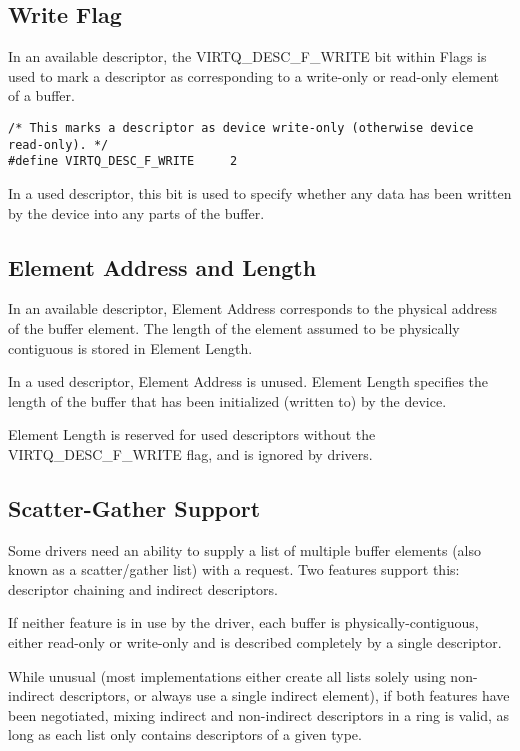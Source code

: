 \subsection{Write Flag}
\label{sec:Packed Virtqueues / Write Flag}

In an available descriptor, the VIRTQ_DESC_F_WRITE bit within Flags
is used to mark a descriptor as corresponding to a write-only or
read-only element of a buffer.

\begin{lstlisting}
/* This marks a descriptor as device write-only (otherwise device read-only). */
#define VIRTQ_DESC_F_WRITE     2
\end{lstlisting}

In a used descriptor, this bit is used to specify whether any
data has been written by the device into any parts of the buffer.


\subsection{Element Address and Length}
\label{sec:Packed Virtqueues / Element Address and Length}

In an available descriptor, Element Address corresponds to the
physical address of the buffer element. The length of the element assumed
to be physically contiguous is stored in Element Length.

In a used descriptor, Element Address is unused. Element Length
specifies the length of the buffer that has been initialized
(written to) by the device.

Element Length is reserved for used descriptors without the
VIRTQ_DESC_F_WRITE flag, and is ignored by drivers.

\subsection{Scatter-Gather Support}
\label{sec:Packed Virtqueues / Scatter-Gather Support}

Some drivers need an ability to supply a list of multiple buffer
elements (also known as a scatter/gather list) with a request.
Two features support this: descriptor chaining and indirect descriptors.

If neither feature is in use by the driver, each buffer is
physically-contiguous, either read-only or write-only and is
described completely by a single descriptor.

While unusual (most implementations either create all lists
solely using non-indirect descriptors, or always use a single
indirect element), if both features have been negotiated, mixing
indirect and non-indirect descriptors in a ring is valid, as long as each
list only contains descriptors of a given type.

